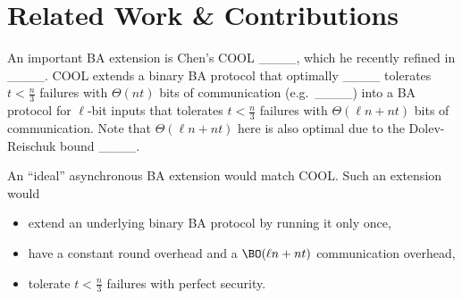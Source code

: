 \section{Related Work \& Contributions}
An important BA extension is Chen's COOL ____, which he recently refined in ____. COOL extends a binary BA protocol that optimally ____ tolerates $t < \frac{n}{3}$ failures with $\Theta(nt)$ bits of communication (e.g.\ ____) into a BA protocol for $\ell$-bit inputs that tolerates $t < \frac{n}{3}$ failures with $\Theta(\ell n + nt)$ bits of communication. Note that $\Theta(\ell n + nt)$ here is also optimal due to the Dolev-Reischuk bound ____.

An ``ideal'' asynchronous BA extension would match COOL. Such an extension would \begin{itemize}
    \item extend an underlying binary BA protocol by running it only once, 
    \item have a constant round overhead and a $\BO(\ell n + nt)$ communication overhead,
    \item tolerate $t < \frac{n}{3}$ failures with perfect security.
\end{itemize}

